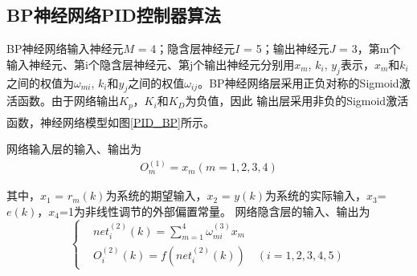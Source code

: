 \documentclass[UTF8,a4paper,10pt,nocolorlinks]{ctexart}
\newcommand{\upcite}[1]{\textsuperscript{\textsuperscript{\cite{#1}}}}
\begin{document}
    \subsection{BP神经网络PID控制器算法}
    BP神经网络输入神经元$M$ = 4；隐含层神经元$I$ = 5；输出神经元$J$ = 3，第m个输入神经元、第i个隐含层神经元、第j个输出神经元分别用$x_{m}$, $k_{i}$, $y_{j}$表示，$x_{m}$和$k_{i}$之间的权值为$\omega_{mi}$, $k_{i}$和$y_{j}$之间的权值$\omega_{ij}$。BP神经网络层采用正负对称的Sigmoid激活函数。由于网络输出$K_{p}$，$K_{i}$和$K_{D}$为负值，因此
    输出层采用非负的Sigmoid激活函数\upcite{5}，神经网络模型如图\ref{PID_BP}所示。\par
    网络输入层的输入、输出为
    \begin{equation} %
        \begin{aligned}
        O_{m}^{(1)} =x_{m}(m=1,2,3,4)  
        \end{aligned}
    \end{equation}
    \par 其中，$x_{1}$ = $r_{m}(k)$为系统的期望输入，$x_{2}$ = $y(k)$为系统的实际输入，$x_{3}$=$e(k)$，$x_{4}$=1为非线性调节的外部偏置常量。
    网络隐含层的输入、输出为
    \begin{equation}
        \begin{cases}
        & net_{i}^{(2)}(k)=\sum\limits_{m=1}^{4}\omega_{mi}^{(3)}x_{m}\\
        & O_{i}^{(2)}(k)=f(net_{i}^{(2)}(k)) \hspace{1em}(i=1,2,3,4,5)
        \end{cases}
    \end{equation}
\end{document}
